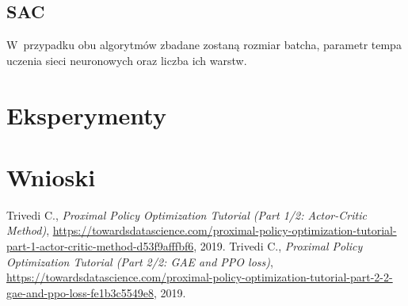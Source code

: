 \documentclass[a4paper,12pt]{article}
\let\oldsection\section
\renewcommand\section{\clearpage\oldsection}
\begin{document}
\subsection{SAC}



W~przypadku obu algorytmów zbadane zostaną rozmiar batcha, parametr tempa uczenia sieci neuronowych oraz liczba ich warstw.

\section{Eksperymenty}


\section{Wnioski}


\begin{thebibliography}{20}
	 Trivedi C., \textit{Proximal Policy Optimization Tutorial (Part 1/2: Actor-Critic Method)}, \url{https://towardsdatascience.com/proximal-policy-optimization-tutorial-part-1-actor-critic-method-d53f9afffbf6}, 2019.
	 Trivedi C., \textit{Proximal Policy Optimization Tutorial (Part 2/2: GAE and PPO loss)}, \url{https://towardsdatascience.com/proximal-policy-optimization-tutorial-part-2-2-gae-and-ppo-loss-fe1b3c5549e8}, 2019.
\end{thebibliography}
\end{document}
